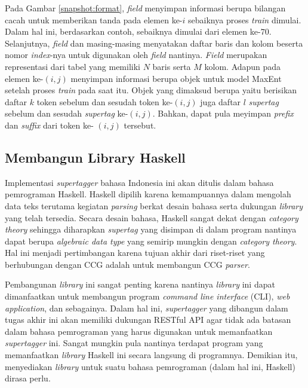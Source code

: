 Pada Gambar \ref{snapshot:format}, \textit{field}  menyimpan informasi berupa
bilangan cacah untuk memberikan tanda pada elemen ke-$i$ sebaiknya proses \textit{train} dimulai.
Dalam hal ini, berdasarkan contoh, sebaiknya dimulai dari elemen ke-$70$.
Selanjutnya, \textit{field}  dan  masing-masing menyatakan daftar baris dan
kolom beserta nomor \textit{index}-nya untuk digunakan oleh \textit{field}  nantinya.
\textit{Field}  merupakan representasi dari tabel yang memiliki $N$ baris serta $M$
kolom.
Adapun  pada elemen ke-$(i, j)$ menyimpan informasi berupa objek untuk model MaxEnt
setelah proses \textit{train} pada  saat itu.
Objek yang dimaksud berupa  yaitu berisikan daftar $k$ token sebelum dan sesudah token
ke-$(i, j)$ juga daftar $l$ \textit{supertag} sebelum dan sesudah \textit{supertag} ke-$(i, j)$.
Bahkan,  dapat pula meyimpan \textit{prefix} dan \textit{suffix} dari token ke-
$(i, j)$ tersebut.

\subsection{Membangun Library Haskell}

Implementasi \textit{supertagger} bahasa Indonesia ini akan ditulis dalam bahasa pemrograman Haskell.
Haskell dipilih karena kemampuannya dalam mengolah data teks terutama kegiatan \textit{parsing} berkat
desain bahasa serta dukungan \textit{library} yang telah tersedia.
Secara desain bahasa, Haskell sangat dekat dengan \textit{category theory} sehingga diharapkan
\textit{supertag} yang disimpan di dalam program nantinya dapat berupa \textit{algebraic data type}
yang semirip mungkin dengan \textit{category theory}.
Hal ini menjadi pertimbangan karena tujuan akhir dari riset-riset yang berhubungan dengan CCG adalah
untuk membangun CCG \textit{parser}.

Pembangunan \textit{library} ini sangat penting karena nantinya \textit{library} ini dapat dimanfaatkan
untuk membangun program \textit{command line interface} (CLI), \textit{web application}, dan sebagainya.
Dalam hal ini, \textit{supertagger} yang dibangun dalam tugas akhir ini akan memiliki dukungan RESTful
API agar tidak ada batasan dalam bahasa pemrograman yang harus digunakan untuk memanfaatkan
\textit{supertagger} ini.
Sangat mungkin pula nantinya terdapat program yang memanfaatkan \textit{library} Haskell ini secara
langsung di programnya.
Demikian itu, menyediakan \textit{library} untuk suatu bahasa pemrograman (dalam hal ini, Haskell)
dirasa perlu.

